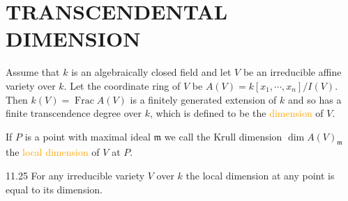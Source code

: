 \section*{TRANSCENDENTAL DIMENSION}

Assume that $k$ is an algebraically closed field and let $V$ be an irreducible affine variety over $k$. Let the coordinate ring of $V$ be $A(V)=k[x_1,\cdots,x_n]/I(V)$. Then $k(V)=\operatorname{Frac}A(V)$ is a finitely generated extension of $k$ and so has a finite transcendence degree over $k$, which is defined to be the \textcolor{orange}{dimension} of $V$.

If $P$ is a point with maximal ideal $\mathfrak{m}$ we call the Krull dimension $\dim A(V)_\mathfrak{m}$ the \textcolor{orange}{ local dimension} of $V$ at $P$.

\begin{theorem}{11.25}
	For any irreducible variety $V$ over $k$ the local dimension at any point is equal to its dimension.
\end{theorem}

